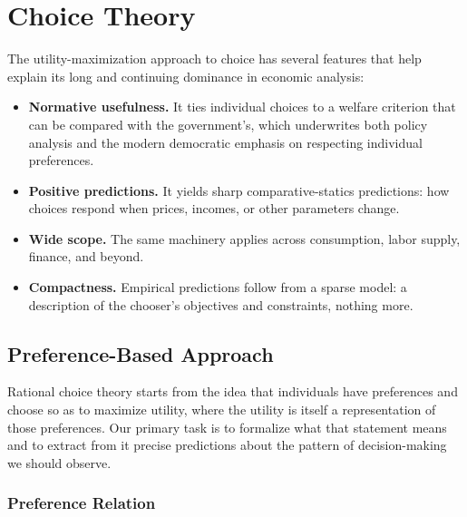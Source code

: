 \chapter{Choice Theory}

The utility-maximization approach to choice has several features that
help explain its long and continuing dominance in economic analysis:

\begin{itemize}
\item
  \textbf{Normative usefulness.} It ties individual choices to a welfare
  criterion that can be compared with the government's, which
  underwrites both policy analysis and the modern democratic emphasis on
  respecting individual preferences.
\item
  \textbf{Positive predictions.} It yields sharp comparative-statics
  predictions: how choices respond when prices, incomes, or other
  parameters change.
\item
  \textbf{Wide scope.} The same machinery applies across consumption,
  labor supply, finance, and beyond.
\item
  \textbf{Compactness.} Empirical predictions follow from a sparse
  model: a description of the chooser's objectives and constraints,
  nothing more.
\end{itemize}

\section{Preference-Based Approach}\label{preference-based-approach}

Rational choice theory starts from the idea that individuals have
preferences and choose so as to maximize utility, where the utility is
itself a representation of those preferences. Our primary task is to
formalize what that statement means and to extract from it precise
predictions about the pattern of decision-making we should observe.

\subsection{Preference Relation}\label{preference-relation}


